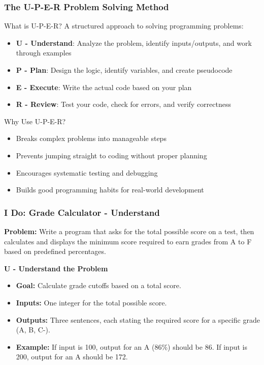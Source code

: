 \documentclass{beamer}
\begin{document}
\begin{frame}
\frametitle{The U-P-E-R Problem Solving Method}
\begin{block}{What is U-P-E-R?}
A structured approach to solving programming problems:
\begin{itemize}
    \item \textbf{U - Understand}: Analyze the problem, identify inputs/outputs, and work through examples
    \item \textbf{P - Plan}: Design the logic, identify variables, and create pseudocode
    \item \textbf{E - Execute}: Write the actual code based on your plan
    \item \textbf{R - Review}: Test your code, check for errors, and verify correctness
\end{itemize}
\end{block}
\pause
\begin{block}{Why Use U-P-E-R?}
\begin{itemize}
    \item Breaks complex problems into manageable steps
    \item Prevents jumping straight to coding without proper planning
    \item Encourages systematic testing and debugging
    \item Builds good programming habits for real-world development
\end{itemize}
\end{block}
\end{frame}

\begin{frame}
\frametitle{I Do: Grade Calculator - Understand}
\textbf{Problem:} Write a program that asks for the total possible score on a test, then calculates and displays the minimum score required to earn grades from A to F based on predefined percentages.

\vspace{1em}
\textbf{U - Understand the Problem}
\begin{itemize}
    \item \textbf{Goal:} Calculate grade cutoffs based on a total score.
    \item \textbf{Inputs:} One integer for the total possible score.
    \item \textbf{Outputs:} Three sentences, each stating the required score for a specific grade (A, B, C-).
    \item \textbf{Example:} If input is 100, output for an A (86\%) should be 86. If input is 200, output for an A should be 172.
\end{itemize}
\end{frame}
\end{document}
